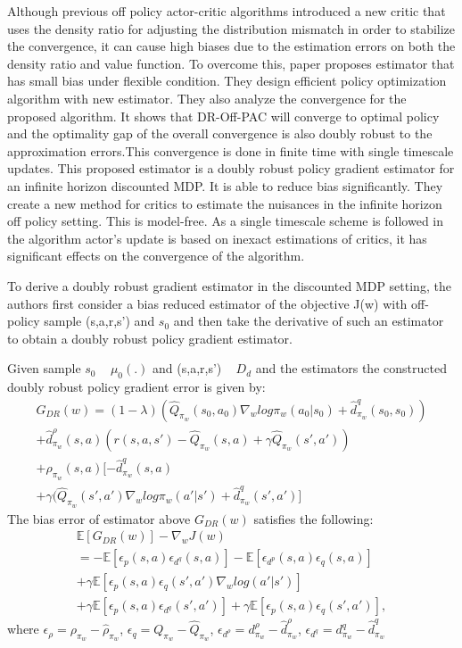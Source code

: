  Although previous off policy actor-critic algorithms introduced a new critic that uses the density ratio for adjusting the distribution mismatch in order to stabilize the convergence, it can cause high biases due to the estimation errors on both the density ratio and value function. To overcome this, paper \cite{xu2021doubly} proposes estimator that has small bias under flexible condition. They design efficient policy optimization algorithm with new estimator. They also analyze the convergence for the proposed algorithm. It shows that DR-Off-PAC will converge to optimal policy and the optimality gap of the overall convergence is also doubly robust to the approximation errors.This convergence is done in finite time with single timescale updates. This proposed estimator is a doubly robust policy gradient estimator for an infinite horizon discounted MDP. It is able to reduce bias significantly. They create a new method for critics to estimate the nuisances in the infinite horizon off policy setting. This is model-free. As a single timescale scheme is followed in the algorithm actor's update is based on inexact estimations of critics, it has significant effects on the convergence of the algorithm.

To derive a doubly robust gradient estimator in the discounted MDP setting, the authors first consider a bias reduced estimator of the objective J(w) with off-policy sample (s,a,r,s') and $s_0$ and then take the derivative of such an estimator to obtain a doubly robust policy gradient estimator.

Given sample $s_0$ ~ $\mu_0 (.)$ and (s,a,r,s') ~ $D_d$ and the estimators the constructed doubly robust policy gradient error is given by:
\begin{multline*}
    G_{DR}(w)=(1-\lambda) (\hat{Q}_{\pi_w}(s_0,a_0) \nabla_w log \pi_w(a_0|s_0)+\hat{d}^{q}_{\pi_w}(s_0,s_0))\\
    + \hat{d}^{\rho}_{\pi_w}(s,a)(r(s,a,s')-\hat{Q}_{\pi_w}(s,a) + \gamma \hat{Q}_{\pi_w}(s',a'))\\
    + \hat{\rho}_{\pi_w}(s,a)[-\hat{d}^{q}_{\pi_w}(s,a)\\
    + \gamma(\hat{Q}_{\pi_w}(s',a')\nabla_w log \pi_w (a'|s')+\hat{d}^q_{\pi_w}(s',a')]
\end{multline*}
The bias error of estimator above $G_{DR}(w)$ satisfies the following: 
\begin{multline*}
    \mathbb{E}[G_{DR}(w)]-\nabla_w J(w)\\
    =-\mathbb{E}[\epsilon_p(s,a)\epsilon_{d^q}(s,a)]-\mathbb{E}[\epsilon_{d^p}(s,a)\epsilon_q(s,a)]\\
    +\gamma \mathbb{E}[\epsilon_p(s,a)\epsilon_q(s',a')\nabla_w log(a'|s')]\\
    +\gamma \mathbb{E}[\epsilon_p(s,a)\epsilon_{d^q}(s',a')]+\gamma \mathbb{E}[\epsilon_p(s,a)\epsilon_q(s',a')],
\end{multline*}
where $\epsilon_\rho=\rho_{\pi_w}-\hat{\rho}_{\pi_w}$, $\epsilon_q=Q_{\pi_w}-\hat{Q}_{\pi_w}$,
$\epsilon_{d^\rho}=d^{\rho}_{\pi_w}-\hat{d}^{\rho}_{\pi_w}$, $\epsilon_{d^q}=d^q_{\pi_w}-\hat{d}^q_{\pi_w}$

